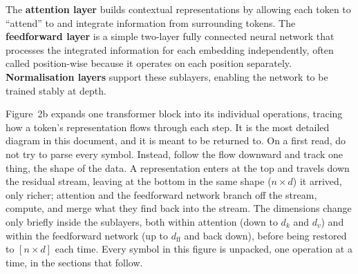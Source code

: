 \documentclass[11pt]{article}
\begin{document}
The \textbf{attention layer} builds contextual representations by allowing each token to ``attend'' to and integrate information from surrounding tokens. The \textbf{feedforward layer} is a simple two-layer fully connected neural network that processes the integrated information for each embedding independently, often called position-wise because it operates on each position separately. \textbf{Normalisation layers} support these sublayers, enabling the network to be trained stably at depth.

\newpage
Figure~2b expands one transformer block into its individual operations, tracing how a token's representation flows through each step. It is the most detailed diagram in this document, and it is meant to be returned to. On a first read, do not try to parse every symbol. Instead, follow the flow downward and track one thing, the shape of the data. A representation enters at the top and travels down the residual stream, leaving at the bottom in the same shape ($n \times d$) it arrived, only richer; attention and the feedforward network branch off the stream, compute, and merge what they find back into the stream. The dimensions change only briefly inside the sublayers, both within attention (down to $d_k$ and $d_v$) and within the feedforward network (up to $d_{\text{ff}}$ and back down), before being restored to $[n \times d]$ each time. Every symbol in this figure is unpacked, one operation at a time, in the sections that follow.
\end{document}
